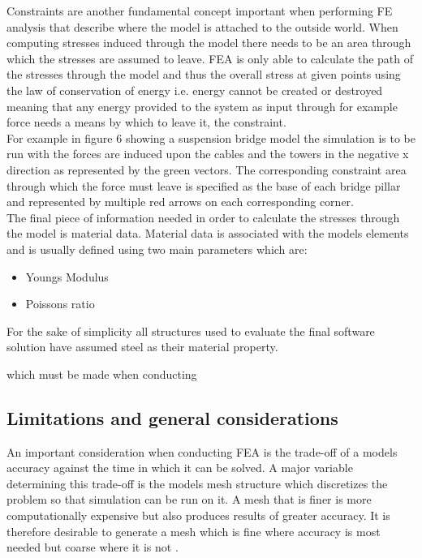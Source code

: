 \documentclass{article}
\begin{document}

\noindent
Constraints are another fundamental concept important when performing FE analysis that describe where the model is attached to the outside world. When computing stresses induced through the model there needs to be an area through which the stresses are assumed to leave. FEA is only able to calculate the path of the stresses through the model and thus the overall stress at given points using the law of conservation of energy i.e. energy cannot be created or destroyed meaning that any energy provided to the system as input through for example force needs a means by which to leave it, the constraint. \\

\noindent
For example in figure 6 showing a suspension bridge model the simulation is to be run with the forces are induced upon the cables and the towers in the negative x direction as represented by the green vectors. The corresponding constraint area through which the force must leave is specified as the base of each bridge pillar and represented by multiple red arrows on each corresponding corner.\\

\noindent
The final piece of information needed in order to calculate the stresses through the model is material data. Material data is associated with the models elements and is usually defined using two main parameters which are:

\begin{itemize}
\item Youngs Modulus
\item Poissons ratio
\end{itemize}

For the sake of simplicity all structures used to evaluate the final software solution have assumed steel as their material property. 

\noindent
which must be made when conducting


\subsection{Limitations and general considerations}
\noindent
An important consideration when conducting FEA is the trade-off of a models accuracy against the time in which it can be solved. A major variable determining this trade-off is the models mesh structure which discretizes the problem so that simulation can be run on it. A mesh that is finer is more computationally expensive but also produces results of greater accuracy. It is therefore desirable to generate a mesh which is fine where accuracy is most needed but coarse where it is not \cite{cite04}. \\
\end{document}
